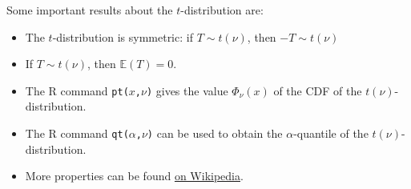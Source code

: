 \documentclass[
  a4paper,
]{article}
\theoremstyle{definition}
\theoremstyle{definition}
\theoremstyle{definition}
\theoremstyle{definition}
\theoremstyle{remark}
\begin{document}
Some important results about the \(t\)-distribution are:

\begin{itemize}
\item
  The \(t\)-distribution is symmetric: if \(T \sim t(\nu)\), then
  \(-T \sim t(\nu)\)
\item
  If \(T\sim t(\nu)\), then \(\mathbb{E}(T) = 0\).
\item
  The R command \texttt{pt(\textbar{}}\(x\)\texttt{,}\(\nu\)\texttt{)} gives the value
  \(\Phi_\nu(x)\) of the CDF of the \(t(\nu)\)-distribution.
\item
  The R command \texttt{qt(}\(\alpha\)\texttt{,}\(\nu\)\texttt{)} can
  be used to obtain the
  \(\alpha\)-quantile of the \(t(\nu)\)-distribution.
\item
  More properties can be found
  \href{https://en.wikipedia.org/wiki/Student\%27s_t-distribution}{on Wikipedia}.
\end{itemize}

\clearpage
\end{document}
